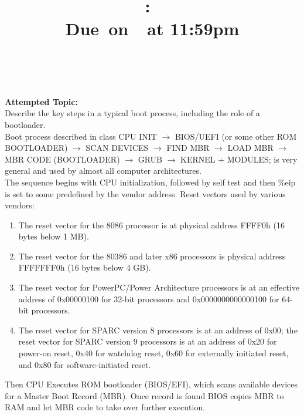 \documentclass{article}
\title{
    \vspace{2in}
    \textmd{\textbf{\hmwkClass:\ \hmwkTitle}}\\
    \normalsize\vspace{0.1in}\small{Due\ on\ \hmwkDueDate\ at 11:59pm}\\
    \vspace{0.1in}\large{\textit{\hmwkClassInstructor\ \hmwkClassTime}}
    \vspace{3in}
}
\author{\textbf{\hmwkAuthorName}}
\date{}
\begin{document}
\maketitle

\pagebreak

        \textbf{Attempted Topic: }\\
        Describe the key steps in a typical boot process, including the role of a bootloader.\\

        Boot process described in class
        CPU INIT $\rightarrow$ BIOS/UEFI (or some other ROM BOOTLOADER) $\rightarrow$ SCAN 
        DEVICES $\rightarrow$ FIND MBR $\rightarrow$ LOAD MBR
        $\rightarrow$ MBR CODE (BOOTLOADER) $\rightarrow$ GRUB $\rightarrow$ KERNEL + MODULES; 
        is very general and used by almost all computer architectures.\\

        The sequence begins with CPU initialization, followed by self test and then \%eip  is 
        set to some predefined by the vendor address.
        Reset vectors used by various vendors:

        \begin{enumerate}[1.]
            \item The reset vector for the 8086 processor is at physical address FFFF0h (16 bytes 
                below 1 MB).
            \item The reset vector for the 80386 and later x86 processors is physical address
                FFFFFFF0h (16 bytes below 4 GB).
            \item The reset vector for PowerPC/Power Architecture processors is at an effective
                address of 0x00000100 for 32-bit processors and 0x0000000000000100 for 64-bit
                processors.
            \item The reset vector for SPARC version 8 processors is at an address of 0x00; the 
                reset vector for SPARC version 9 processors is at an address of 0x20 for power-on 
                reset, 0x40 for watchdog reset, 0x60 for externally initiated reset, and 0x80 for
                software-initiated reset.
        \end{enumerate}


        Then CPU Executes ROM bootloader (BIOS/EFI), which scans available devices for a Master Boot
        Record (MBR). Once record is found BIOS copies MBR to RAM and let MBR code to take over
        further execution.
\end{document}
